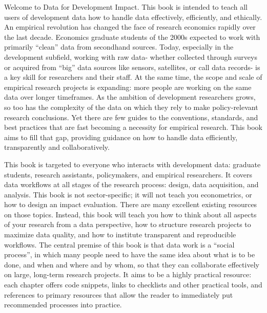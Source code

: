 \begin{fullwidth}
Welcome to Data for Development Impact.
This book is intended to teach all users of development data 
how to handle data effectively, efficiently, and ethically. 
An empirical revolution has changed the face of research economics rapidly over the last decade. 
Economics graduate students of the 2000s expected to work with primarily ``clean'' data from secondhand sources. 
Today, especially in the development subfield, working with raw data- 
whether collected through surveys or acquired from ``big'' data sources like sensors, satellites, or call data records- 
is a key skill for researchers and their staff. 
At the same time, the scope and scale of empirical research projects is expanding: 
more people are working on the same data over longer timeframes. 
As the ambition of development researchers grows, so too has the complexity of the data
on which they rely to make policy-relevant research conclusions. 
Yet there are few guides to the conventions, standards, and best practices 
that are fast becoming a necessity for empirical research.
This book aims to fill that gap, providing guidance on how to handle data efficiently, transparently and collaboratively. 

This book is targeted to everyone who interacts with development data: 
graduate students, research assistants, policymakers, and empirical researchers. 
It covers data workflows at all stages of the research process: design, data acquisition, and analysis.
This book is not sector-specific; it will not teach you econometrics, or how to design an impact evaluation. 
There are many excellent existing resources on those topics. 
Instead, this book will teach you how to think about all aspects of your research from a data perspective, 
how to structure research projects to maximize data quality, 
and how to institute transparent and reproducible workflows. 
The central premise of this book is that data work is a ``social process'',
in which many people need to have the same idea about what is to be done, and when and where and by whom,
so that they can collaborate effectively on large, long-term research projects.
It aims to be a highly practical resource: each chapter offers code snippets, links to checklists and other practical tools, 
and references to primary resources that allow the reader to immediately put recommended processes into practice. 


\end{fullwidth}

